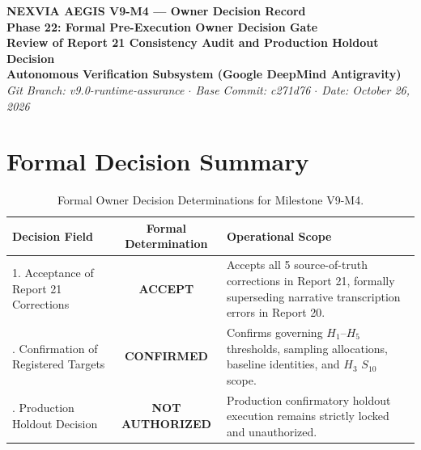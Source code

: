 \documentclass[10pt,a4paper]{article}
\begin{document}
\begin{center}
    {\LARGE \textbf{NEXVIA AEGIS V9-M4 — Owner Decision Record}}\\[6pt]
    {\Large \textbf{Phase 22: Formal Pre-Execution Owner Decision Gate}}\\[3pt]
    {\large \textbf{Review of Report 21 Consistency Audit and Production Holdout Decision}}\\[10pt]
    \textbf{Autonomous Verification Subsystem (Google DeepMind Antigravity)}\\
    \textit{Git Branch: v9.0-runtime-assurance \quad $\cdot$ \quad Base Commit: c271d76 \quad $\cdot$ \quad Date: October 26, 2026}\\[12pt]
\end{center}

\noindent{}

\vspace{10pt}

\section{Formal Decision Summary}

\begin{table}[h!]
\centering
\small
\begin{tabularx}{\textwidth}{l c X}
\toprule
\textbf{Decision Field} & \textbf{Formal Determination} & \textbf{Operational Scope} \\
\midrule
1. Acceptance of Report 21 Corrections & \textbf{ACCEPT} & Accepts all 5 source-of-truth corrections in Report 21, formally superseding narrative transcription errors in Report 20. \\
\addlinespace
2. Confirmation of Registered Targets & \textbf{CONFIRMED} & Confirms governing $H_1$--$H_5$ thresholds, sampling allocations, baseline identities, and $H_3$ $S_{10}$ scope. \\
\addlinespace
3. Production Holdout Decision & \textbf{NOT AUTHORIZED} & Production confirmatory holdout execution remains strictly locked and unauthorized. \\
\bottomrule
\end{tabularx}
\caption{Formal Owner Decision Determinations for Milestone V9-M4.}
\end{table}
\end{document}
